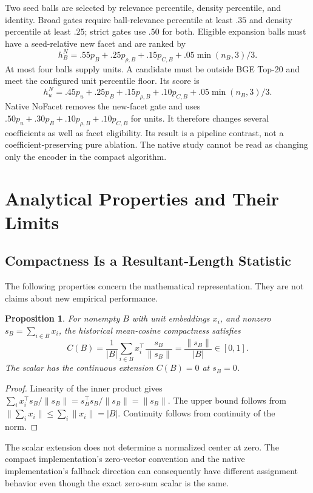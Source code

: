 \documentclass[11pt,a4paper]{article}
\newtheorem{proposition}{Proposition}
\begin{document}
Two seed balls are selected by relevance percentile, density percentile, and
identity. Broad gates require ball-relevance percentile at least $.35$ and
density percentile at least $.25$; strict gates use $.50$ for both.
Eligible expansion balls must have a seed-relative new facet and are ranked by
\begin{equation}
h_B^{N}=.55p_B+.25p_{\rho,B}+.15p_{C,B}
        +.05\min(n_B,3)/3.
\end{equation}
At most four balls supply units. A candidate must be outside BGE Top-20 and
meet the configured unit percentile floor. Its score is
\begin{equation}
h_u^{N}=.45p_u+.25p_B+.15p_{\rho,B}+.10p_{C,B}
        +.05\min(n_B,3)/3.
\end{equation}
Native NoFacet removes the new-facet gate and uses
$.50p_u+.30p_B+.10p_{\rho,B}+.10p_{C,B}$ for units.
It therefore changes several coefficients as well as facet eligibility.
Its result is a pipeline contrast, not a coefficient-preserving pure ablation.
The native study cannot be read as changing only the encoder in the compact
algorithm.

\section{Analytical Properties and Their Limits}
\label{sec:theory}
\subsection{Compactness Is a Resultant-Length Statistic}
The following properties concern the mathematical representation. They are
not claims about new empirical performance.
\begin{proposition}
For nonempty $B$ with unit embeddings $x_i$, and nonzero
$s_B=\sum_{i\in B}x_i$, the historical mean-cosine compactness satisfies
\begin{equation}
C(B)=\frac{1}{|B|}\sum_{i\in B}x_i^\top\frac{s_B}{\|s_B\|}
     =\frac{\|s_B\|}{|B|}\in[0,1].
\end{equation}
The scalar has the continuous extension $C(B)=0$ at $s_B=0$.
\end{proposition}
\begin{proof}
Linearity of the inner product gives
$\sum_i x_i^\top s_B/\|s_B\|=s_B^\top s_B/\|s_B\|=\|s_B\|$.
The upper bound follows from $\|\sum_i x_i\|\leq\sum_i\|x_i\|=|B|$.
Continuity follows from continuity of the norm.
\end{proof}
The scalar extension does not determine a normalized center at zero.
The compact implementation's zero-vector convention and the native
implementation's fallback direction can consequently have different
assignment behavior even though the exact zero-sum scalar is the same.
\end{document}
